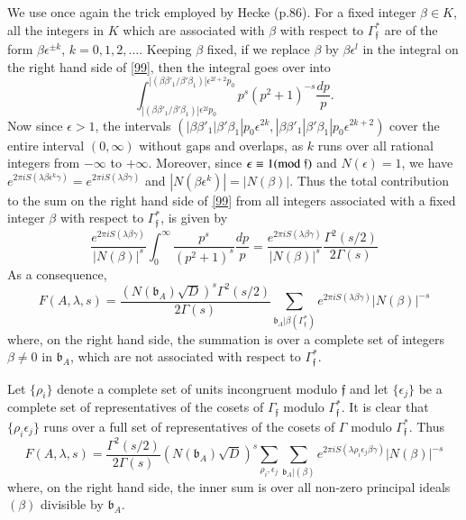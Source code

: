 We use once again the trick employed by Hecke (p.\@ 86). For a fixed
integer $\beta\in K$, all the integers in $K$ which are associated
with $\beta$ with respect to $\Gamma^{\ast}_{\mathfrak{f}}$ are of the
form $\beta\epsilon^{\pm k}$, $k=0,1,2,\ldots$. Keeping $\beta$ fixed,
if we replace $\beta$ by $\beta\epsilon^{l}$ in the integral on the
right hand side of \eqref{99}, then the integral goes over into
$$
\int^{|(\beta\beta'_{1}/\beta'\beta_{1})|\epsilon^{2l+2}p_{0}}_{|(\beta\beta'_{1}/\beta'\beta_{1})|\epsilon^{2l}p_{0}}p^{s}(p^{2}+1)^{-s}\frac{dp}{p}.
$$
Now since $\epsilon>1$, the intervals
$(|\beta\beta'_{1}|\beta'\beta_{1}|p_{0}\epsilon^{2k},|\beta\beta'_{1}|\beta'\beta_{1}|p_{0}\epsilon^{2k+2})$
cover the entire interval $(0,\infty)$ without gaps and overlaps, as
$k$ runs over all rational integers from $-\infty$ to
$+\infty$. Moreover, since $\epsilon\equiv 1(\rm{mod} \;\mathfrak{f})$ and
$N(\epsilon)=1$, we have $e^{2\pi
  iS(\lambda\beta\epsilon^{k}\gamma)}=e^{2\pi iS(\lambda\beta\gamma)}$
and $|N(\beta\epsilon^{k})|=|N(\beta)|$. Thus the total contribution
to the sum on the right hand side of \eqref{99} from all integers
associated with a fixed integer $\beta$ with respect to
$\Gamma^{\ast}_{\mathfrak{f}}$, is given by 
$$
\frac{e^{2\pi
    iS(\lambda\beta\gamma)}}{|N(\beta)|^{s}}\int^{\infty}_{0}\frac{p^{s}}{(p^{2}+1)^{s}}\frac{dp}{p}=\frac{e^{2\pi
    iS(\lambda\beta\gamma)}}{|N(\beta)|^{s}}\frac{\Gamma^{2}(s/2)}{2\Gamma(s)} 
$$\pageoriginale
As a consequence,
\begin{equation*}
F(A,\lambda,s)=\frac{(N(\mathfrak{b}_{A})\sqrt{D})^{s}\Gamma^{2}(s/2)}{2\Gamma(s)}\sum_{\mathfrak{b}_{A}|\beta(\Gamma^{\ast}_{\mathfrak{f}})}e^{2\pi
  iS(\lambda\beta\gamma)}|N(\beta)|^{-s}\tag{100}\label{100} 
\end{equation*}
where, on the right hand side, the summation is over a complete set of
integers $\beta\neq 0$ in $\mathfrak{b}_{A}$, which are not associated
with respect to $\Gamma^{\ast}_{\mathfrak{f}}$.

Let $\{\rho_{i}\}$ denote a complete set of units incongruent modulo
$\mathfrak{f}$ and let $\{\epsilon_{j}\}$ be a complete set of
representatives of the cosets of $\Gamma_{\mathfrak{f}}$ modulo
$\Gamma^{\ast}_{\mathfrak{f}}$. It is clear that
$\{\rho_{i}\epsilon_{j}\}$ runs over a full set of representatives of
the cosets of $\Gamma$ modulo $\Gamma^{\ast}_{\mathfrak{f}}$. Thus
\begin{equation*}
F(A,\lambda,s)=\frac{\Gamma^{2}(s/2)}{2\Gamma(s)}(N(\mathfrak{b}_{A})\sqrt{D})^{s}\sum_{\rho_{i},\epsilon_{j}}\sum_{\mathfrak{b}_{A}|(\beta)}e^{2\pi iS(\lambda\rho_{i}\epsilon_{j}\beta\gamma)}|N(\beta)|^{-s}\tag{101}\label{101}
\end{equation*}
where, on the right hand side, the inner sum is over all non-zero
principal ideals $(\beta)$ divisible by $\mathfrak{b}_{A}$.

